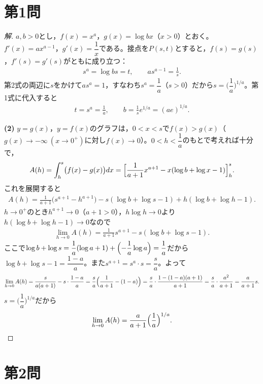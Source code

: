 \documentclass[../main.tex]{subfiles}
\begin{document}
\section*{第1問}

\begin{proof}[解]
  $a,b>0$とし，$f(x)=x^a$，$g(x)=\log bx$（$x>0$）とおく。$f'(x)=ax^{a-1}$，$g'(x)=\dfrac1x$である。接点を$P(s,t)$とすると，$f(s)=g(s)$，$f'(s)=g'(s)$がともに成り立つ：
  \begin{align*}
    s^a=\log bs=t,\qquad as^{a-1}=\frac1s.
  \end{align*}
  第2式の両辺に$s$をかけて$as^a=1$，すなわち$s^a=\dfrac1a$（$s>0$）だから$s=\bigl(\dfrac1a\bigr)^{1/a}$。第1式に代入すると
  \begin{align*}
    t=s^a=\frac1a,\qquad b=\frac1se^{1/a}=(ae)^{1/a}.
  \end{align*}

  \textbf{(2)} $y=g(x)$，$y=f(x)$のグラフは，$0<x<s$で$f(x)>g(x)$（$g(x)\to-\infty\ (x\to0^+)$に対し$f(x)\to0$）。$0<h<\dfrac1a$のもとで考えれば十分で，
  \begin{align*}
    A(h)=\int_h^s\bigl(f(x)-g(x)\bigr)dx=\Bigl[\frac1{a+1}x^{a+1}-x(\log b+\log x-1)\Bigr]_h^s.
  \end{align*}
  これを展開すると
  \begin{align*}
    A(h)=\frac1{a+1}\bigl(s^{a+1}-h^{a+1}\bigr)-s(\log b+\log s-1)+h(\log b+\log h-1).
  \end{align*}
  $h\to0^+$のとき$h^{a+1}\to0$（$a+1>0$），$h\log h\to0$より$h(\log b+\log h-1)\to0$なので
  \begin{align*}
    \lim_{h\to0}A(h)=\frac1{a+1}s^{a+1}-s(\log b+\log s-1).
  \end{align*}
  ここで$\log b+\log s=\dfrac1a(\log a+1)+\Bigl(-\dfrac1a\log a\Bigr)=\dfrac1a$だから$\log b+\log s-1=\dfrac{1-a}a$。また$s^{a+1}=s^a\cdot s=\dfrac sa$。よって
  \begin{align*}
    \lim_{h\to0}A(h)=\frac s{a(a+1)}-s\cdot\frac{1-a}a=\frac sa\Bigl(\frac1{a+1}-(1-a)\Bigr)=\frac sa\cdot\frac{1-(1-a)(a+1)}{a+1}=\frac sa\cdot\frac{a^2}{a+1}=\frac{a}{a+1}s.
  \end{align*}
  $s=\bigl(\dfrac1a\bigr)^{1/a}$だから
  \begin{align*}
    \lim_{h\to0}A(h)=\frac a{a+1}\Bigl(\frac1a\Bigr)^{1/a}.
  \end{align*}
\end{proof}

\newpage

\section*{第2問}
\end{document}
